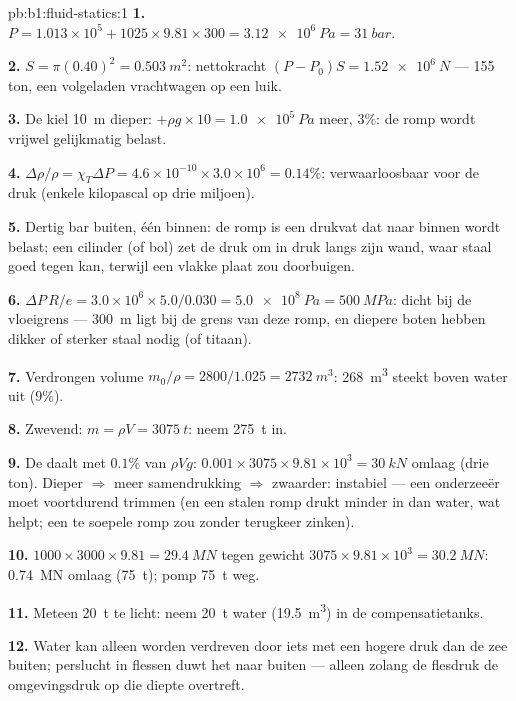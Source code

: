 \begin{solution}{pb:b1:fluid-statics:1}
\textbf{1.} $P = 1.013\times10^5 + 1025 \times 9.81 \times 300 = \qty{3.12e6}{Pa}
= \qty{31}{bar}$.

\textbf{2.} $S = \pi(0.40)^2 = \qty{0.503}{m^2}$: nettokracht $(P - P_0)S =
\qty{1.52e6}{N}$ --- 155 ton, een volgeladen vrachtwagen op een luik.

\textbf{3.} De kiel \qty{10}{m} dieper: $+\rho g \times 10 = \qty{1.0e5}{Pa}$ meer,
$3\%$: de romp wordt vrijwel gelijkmatig belast.

\textbf{4.} $\Delta\rho/\rho = \chi_T\Delta P = 4.6\times10^{-10} \times 3.0\times10^6
= 0.14\%$: verwaarloosbaar voor de druk (enkele kilopascal op drie
miljoen).

\textbf{5.} Dertig bar buiten, één binnen: de romp is een drukvat
dat naar binnen wordt belast; een cilinder (of bol) zet de druk om in
druk langs zijn wand, waar staal goed tegen kan, terwijl een vlakke
plaat zou doorbuigen.

\textbf{6.} $\Delta P\,R/e = 3.0\times10^6 \times 5.0/0.030 = \qty{5.0e8}{Pa}
= \qty{500}{MPa}$: dicht bij de vloeigrens --- \qty{300}{m} ligt bij de
grens van deze romp, en diepere boten hebben dikker of sterker staal
nodig (of titaan).

\textbf{7.} Verdrongen volume $m_0/\rho = 2800/1.025 = \qty{2732}{m^3}$: \qty{268}{m^3}
steekt boven water uit ($9\%$).

\textbf{8.} Zwevend: $m = \rho V = \qty{3075}{t}$: neem \qty{275}{t} in.

\textbf{9.} De  daalt met $0.1\%$ van $\rho Vg$: $0.001 \times 3075 \times 9.81
\times10^3 = \qty{30}{kN}$ omlaag (drie ton). Dieper $\Rightarrow$ meer
samendrukking $\Rightarrow$ zwaarder: instabiel --- een onderzeeër moet
voortdurend trimmen (en een stalen romp drukt minder in dan water, wat helpt;
een te soepele romp zou zonder terugkeer zinken).

\textbf{10.}  $1000 \times 3000 \times 9.81 = \qty{29.4}{MN}$ tegen
gewicht $3075 \times 9.81 \times 10^3 = \qty{30.2}{MN}$: \qty{0.74}{MN} omlaag
(\qty{75}{t}); pomp \qty{75}{t} weg.

\textbf{11.} Meteen \qty{20}{t} te licht: neem \qty{20}{t} water
(\qty{19.5}{m^3}) in de compensatietanks.

\textbf{12.} Water kan alleen worden verdreven door iets met een hogere druk
dan de zee buiten; perslucht in flessen duwt het naar buiten --- alleen
zolang de flesdruk de omgevingsdruk op die diepte
overtreft.


\end{solution}
